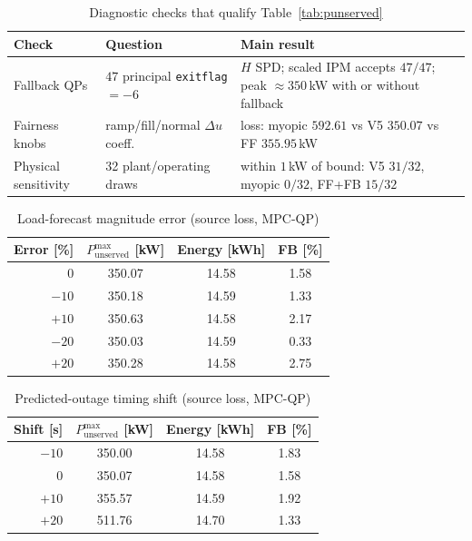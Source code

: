 \documentclass{ieeeaccess}
\begin{document}
\begin{table}[!t]
\centering
\caption{Diagnostic checks that qualify Table~\ref{tab:punserved}}
\label{tab:diagpkg}
{\footnotesize\setlength{\tabcolsep}{4pt}%
\begin{tabular*}{\textwidth}{@{\extracolsep{\fill}}llp{8.6cm}@{}}
\toprule
Check & Question & Main result \\
\midrule
Fallback QPs & $47$ principal \texttt{exitflag}$=-6$ & $H$ SPD; scaled IPM accepts $47/47$; peak $\approx 350$\,kW with or without fallback \\
Fairness knobs & ramp/fill/normal $\Delta u$ coeff. & loss: myopic $592.61$ vs V5 $350.07$ vs FF $355.95$\,kW \\
Physical sensitivity & 32 plant/operating draws & within $1$\,kW of bound: V5 $31/32$, myopic $0/32$, FF+FB $15/32$ \\
\bottomrule
\end{tabular*}}
\end{table}

\begin{table}[!t]
\centering
\caption{Load-forecast magnitude error (source loss, MPC-QP)}
\label{tab:err_mag}
\begin{tabular}{@{}rccc@{}}
\toprule
Error [\%] & $P_{\mathrm{unserved}}^{\max}$ [kW] & Energy [kWh] & FB [\%] \\
\midrule
0 & 350.07 & 14.58 & 1.58 \\
$-10$ & 350.18 & 14.59 & 1.33 \\
$+10$ & 350.63 & 14.58 & 2.17 \\
$-20$ & 350.03 & 14.59 & 0.33 \\
$+20$ & 350.28 & 14.58 & 2.75 \\
\bottomrule
\end{tabular}
\end{table}

\begin{table}[!t]
\centering
\caption{Predicted-outage timing shift (source loss, MPC-QP)}
\label{tab:err_time}
\begin{tabular}{@{}rccc@{}}
\toprule
Shift [s] & $P_{\mathrm{unserved}}^{\max}$ [kW] & Energy [kWh] & FB [\%] \\
\midrule
$-10$ & 350.00 & 14.58 & 1.83 \\
0 & 350.07 & 14.58 & 1.58 \\
$+10$ & 355.57 & 14.59 & 1.92 \\
$+20$ & 511.76 & 14.70 & 1.33 \\
\bottomrule
\end{tabular}
\end{table}
\FloatBarrier
\end{document}
